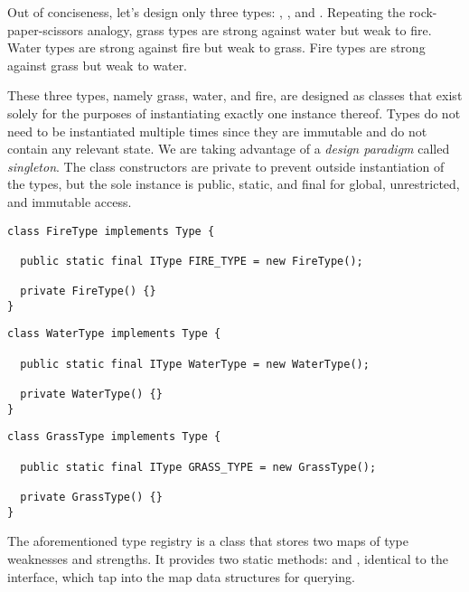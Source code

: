 Out of conciseness, let's design only three types: , , and . Repeating the rock-paper-scissors analogy, grass types are strong against water but weak to fire. Water types are strong against fire but weak to grass. Fire types are strong against grass but weak to water. 

These three types, namely grass, water, and fire, are designed as classes that exist solely for the purposes of instantiating exactly one instance thereof. Types do not need to be instantiated multiple times since they are immutable and do not contain any relevant state. We are taking advantage of a \emph{design paradigm} called \emph{singleton}. The class constructors are private to prevent outside instantiation of the types, but the sole instance is public, static, and final for global, unrestricted, and immutable access.

\begin{lstlisting}[language=MyJava]
class FireType implements Type {

  public static final IType FIRE_TYPE = new FireType();

  private FireType() {}
}
\end{lstlisting}

\begin{lstlisting}[language=MyJava]
class WaterType implements Type {

  public static final IType WaterType = new WaterType();

  private WaterType() {}
}
\end{lstlisting}

\begin{lstlisting}[language=MyJava]
class GrassType implements Type {

  public static final IType GRASS_TYPE = new GrassType();

  private GrassType() {}
}
\end{lstlisting}

The aforementioned type registry is a class that stores two maps of type weaknesses and strengths. It provides two static methods:  and , identical to the  interface, which tap into the map data structures for querying.


